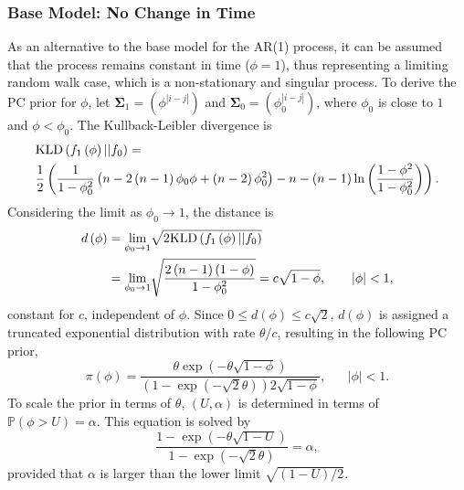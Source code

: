 \documentclass[12pt]{book}
\begin{document}
\subsubsection*{Base Model: No Change in Time} 
As an alternative to the base model for the AR(1) process, it can be assumed that the process remains constant in time ($\phi = 1$), thus representing a limiting random walk case, which is a non-stationary and singular process. To derive the PC prior for $\phi$, let $\pmb{\Sigma}_1=\left(\phi^{|i-j|}\right)$ and $\pmb{\Sigma}_0=\left(\phi_0^{|i-j|}\right)$, where $\phi_0$ is close to $1$ and $\phi<\phi_0$. The Kullback-Leibler divergence is
\begin{align*}
    &\hbox{KLD}\left(f_1\left(\phi\right)||f_0\right)=\\
    &\frac{1}{2}\left(\frac{1}{1-\phi_0^2}\left(n-2\left(n-1\right)\phi_0\phi+\left(n-2\right)\phi_0^2\right)-n-\left(n-1\right)\ln\left(\frac{1-\phi^2}{1-\phi_0^2}\right)\right).
\end{align*}
Considering the limit as $\phi_0\rightarrow1$, the distance is
\begin{align*}
    d\left(\phi\right)&=\underset{\phi_0\rightarrow1}{\lim}\sqrt{2\hbox{KLD}\left(f_1\left(\phi\right)||f_0\right)} \\
    &=\underset{\phi_0\rightarrow1}{\lim}\sqrt{\frac{2\left(n-1\right)\left(1-\phi\right)}{1-\phi_0^2}} = c\sqrt{1-\phi}, \hspace{20pt}|\phi|<1,
\end{align*}
constant for $c$, independent of $\phi$. Since $0\leq d\left(\phi\right)\leq c\sqrt{2}$, $d\left(\phi\right)$ is assigned a truncated exponential distribution with rate $\theta/c$, resulting in the following PC prior,
\begin{equation}
    \pi\left(\phi\right)=\frac{\theta\exp\left(-\theta\sqrt{1-\phi}\right)}{\left(1-\exp\left(-\sqrt{2}\theta\right)\right)2\sqrt{1-\phi}}, \hspace{20pt}|\phi|<1.
\end{equation}
To scale the prior in terms of $\theta$, $\left(U,\alpha\right)$ is determined in terms of $\mathbb{P}\left(\phi>U\right)=\alpha$. This equation is solved by
\begin{equation*}
    \frac{1-\exp\left(-\theta\sqrt{1-U}\right)}{1-\exp\left(-\sqrt{2}\theta\right)}=\alpha,
\end{equation*}
provided that $\alpha$ is larger than the lower limit $\sqrt{\left(1-U\right)/2}$\autocite[Cf.][]{sorbye2017penalised}.
\clearpage
\end{document}
